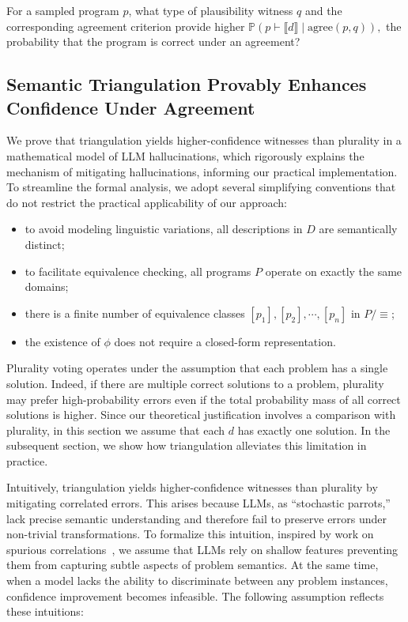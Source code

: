 \documentclass[acmsmall,screen,nonacm]{acmart}
\begin{document}
\begin{definition}\label{def:witness_problem}
  For a sampled program $p$, what type of plausibility witness $q$ and the corresponding agreement criterion provide higher $\mathds{P}(p\vdash \llbracket d \rrbracket \mid \mathrm{agree}(p, q)),$ the probability that the program is correct under an agreement?
\end{definition}

\subsection{Semantic Triangulation Provably Enhances Confidence Under Agreement}

We prove that triangulation yields higher-confidence witnesses than plurality in a mathematical model of LLM hallucinations, which rigorously explains the mechanism of mitigating hallucinations, informing our practical implementation. To streamline the formal analysis, we adopt several simplifying conventions that
  do not restrict the practical applicability of our approach:
\begin{itemize}
\item to avoid modeling linguistic variations, all descriptions in $D$ are semantically distinct;
\item to facilitate equivalence checking, all programs $P$ operate on exactly the same domains;
\item there is a finite number of equivalence classes $[p_1], [p_2], \cdots, [p_n]$ in $P/\equiv$;
\item the existence of $\phi$ does not require a closed-form representation.
\end{itemize}

Plurality voting operates under the assumption that each problem has a single solution. Indeed, if there are multiple correct solutions to a problem, plurality may prefer high-probability errors even if the total probability mass of all correct solutions is higher. Since our theoretical justification involves a comparison with plurality, in this section we assume that each $d$ has exactly one solution. In the subsequent section, we show how triangulation alleviates this limitation in practice.

Intuitively, triangulation yields higher-confidence witnesses than plurality by mitigating correlated errors. This arises because LLMs, as ``stochastic parrots,'' lack precise semantic understanding and therefore fail to preserve errors under non-trivial transformations. To formalize this intuition, inspired by work on spurious correlations~\cite{ye2024spurious}, we assume that LLMs rely on shallow features preventing them from capturing subtle aspects of problem semantics. At the same time, when a model lacks the ability to discriminate between any problem instances, confidence improvement becomes infeasible. The following assumption reflects these intuitions:
\end{document}
